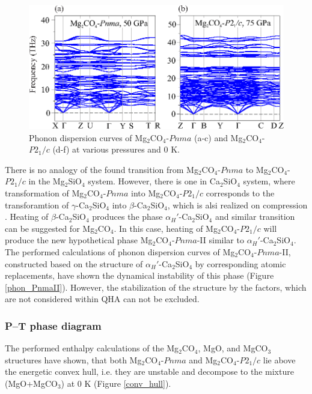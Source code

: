 \documentclass[a4paperm]{article}
\begin{document}
\begin{figure}[H]
	\includegraphics[width=\textwidth]{phon_mg} \centering
	\caption{Phonon dispersion curves of Mg$_2$CO$_4$-$Pnma$ (a-c) and Mg$_2$CO$_4$-$P2_1/c$ (d-f) at various pressures and 0 K.
	} 	\label{phon_mg2co4_main}
\end{figure}



There is no analogy of the found transition from Mg$_2$CO$_4$-$Pnma$ to Mg$_2$CO$_4$-$P2_1/c$ in the Mg$_2$SiO$_4$ system.
However, there is one in Ca$_2$SiO$_4$ system, where transformation of Mg$_2$CO$_4$-$Pnma$ into Mg$_2$CO$_4$-$P2_1/c$ corresponds to the transforamtion of $\gamma$-Ca$_2$SiO$_4$ into $\beta$-Ca$_2$SiO$_4$, which is alsi realized on compression \cite{belmonte2017}.
Heating of $\beta$-Ca$_2$SiO$_4$ produces the phase $\alpha_H'$-Ca$_2$SiO$_4$ and similar transition can be suggested for Mg$_2$CO$_4$.
In this case, heating of Mg$_2$CO$_4$-$P2_1/c$ will produce the new hypothetical phase Mg$_2$CO$_4$-$Pnma$-II similar to $\alpha_H'$-Ca$_2$SiO$_4$.
The performed calculations of phonon dispersion curves of Mg$_2$CO$_4$-$Pnma$-II, constructed based on the structure of $\alpha_H'$-Ca$_2$SiO$_4$ by corresponding atomic replacements, have shown the dynamical instability of this phase (Figure \ref{phon_PnmaII}).
However, the stabilization of the structure by the factors, which are not considered within QHA can not be excluded.




\subsubsection*{P--T phase diagram}

The performed enthalpy calculations of the Mg$_2$CO$_4$, MgO, and MgCO$_3$ structures have shown, that both Mg$_2$CO$_4$-$Pnma$ and Mg$_2$CO$_4$-$P2_1/c$ lie above the energetic convex hull, i.e. they are unstable and decompose to the mixture (MgO+MgCO$_3$) at 0 K (Figure \ref{conv_hull}). 
\end{document}
